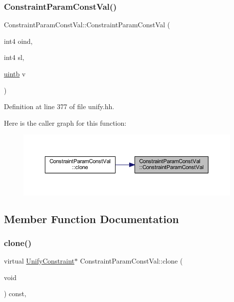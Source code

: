 \subsubsection{\texorpdfstring{ConstraintParamConstVal()}{ConstraintParamConstVal()}}
{\footnotesize\ttfamily Constraint\+Param\+Const\+Val\+::\+Constraint\+Param\+Const\+Val (\begin{DoxyParamCaption}\item[{int4}]{oind,  }\item[{int4}]{sl,  }\item[{\mbox{\hyperlink{types_8h_a2db313c5d32a12b01d26ac9b3bca178f}{uintb}}}]{v }\end{DoxyParamCaption})\hspace{0.3cm}{\ttfamily [inline]}}



Definition at line 377 of file unify.\+hh.

Here is the caller graph for this function\+:
\nopagebreak
\begin{figure}[H]
\begin{center}
\leavevmode
\includegraphics[width=350pt]{class_constraint_param_const_val_a2cab2fc24885c66649a505fb626bef39_icgraph}
\end{center}
\end{figure}


\subsection{Member Function Documentation}
\mbox{\label{class_constraint_param_const_val_a74c4f987687e1919f47c1b1d30b303da}} 
\subsubsection{\texorpdfstring{clone()}{clone()}}
{\footnotesize\ttfamily virtual \mbox{\hyperlink{class_unify_constraint}{Unify\+Constraint}}$\ast$ Constraint\+Param\+Const\+Val\+::clone (\begin{DoxyParamCaption}\item[{void}]{ }\end{DoxyParamCaption}) const\hspace{0.3cm}{\ttfamily [inline]}, {\ttfamily [virtual]}}



